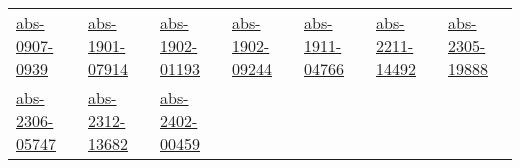 {\begin{longtable}{*{7}{l}}
\href{works/abs-0907-0939.pdf}{abs-0907-0939}~\cite{abs-0907-0939} & \href{works/abs-1901-07914.pdf}{abs-1901-07914}~\cite{abs-1901-07914} & \href{works/abs-1902-01193.pdf}{abs-1902-01193}~\cite{abs-1902-01193} & \href{works/abs-1902-09244.pdf}{abs-1902-09244}~\cite{abs-1902-09244} & \href{works/abs-1911-04766.pdf}{abs-1911-04766}~\cite{abs-1911-04766} & \href{works/abs-2211-14492.pdf}{abs-2211-14492}~\cite{abs-2211-14492} & \href{works/abs-2305-19888.pdf}{abs-2305-19888}~\cite{abs-2305-19888}\\ 
\href{works/abs-2306-05747.pdf}{abs-2306-05747}~\cite{abs-2306-05747} & \href{works/abs-2312-13682.pdf}{abs-2312-13682}~\cite{abs-2312-13682} & \href{works/abs-2402-00459.pdf}{abs-2402-00459}~\cite{abs-2402-00459} & \end{longtable}
}

